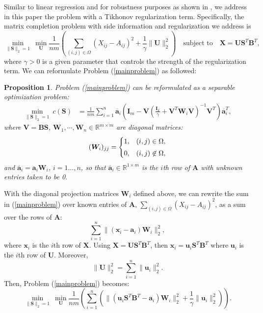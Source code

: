 \documentclass[twoside,11pt]{article}
\newcommand{\md}[1]{\mathbb{#1}}
\newtheorem{prop}{Proposition}
\begin{document}
Similar to linear  regression and for robustness purposes as shown in \cite{bertsimas2018characterization}, we address in this paper  the problem with a Tikhonov regularization term. Specifically, the matrix completion problem with side information and regularization 
we address is
\begin{equation}
\min_{\|\bm{S}\|_2=1} ~\min_{\bm{U}} \frac{1}{nm}\left(\sum_{(i,j) \in \Omega} (X_{ij}-A_{ij})^2 + \frac{1}{\gamma}\|\bm{U}\|_2^2\right) \quad \text{subject to} \quad \bm{X}=\bm{U}\bm{S}^T\bm{B}^T \label{mainproblem},
\end{equation}
where  $\gamma>0$ is a given parameter that controls the strength of the regularization term. We can reformulate Problem (\ref{mainproblem}) as followed:
\begin{prop}
	\label{prop:maintheo}
	Problem (\ref{mainproblem}) can be reformulated as a separable optimization problem:
	\begin{align}
	\min_{\|\bm{S}\|_2=1} ~c(\bm{S})&=\frac{1}{nm} \sum_{i=1}^n \overline{\bm{a}}_i
	\left(\bm{I}_m-\bm{V}\left(\frac{\bm{I}_k}{\gamma}+\bm{V}^T\bm{W}_i\bm{V}\right)^{-1}\bm{V}^T\right)\overline{\bm{a}}_i^T ,\label{eq:mc_central}
	\end{align}
	where $\bm{V}=\bm{B}\bm{S}$, $\bm{W}_1,\cdots, \bm{W}_n\in \md{R}^{m\times m}$
	are   diagonal  matrices:
	\[(\bm{W}_{i})_{jj}=\begin{cases}
	1, & (i,j) \in \Omega, \vspace{3pt} \\
	0, & (i,j) \not \in \Omega,
	\end{cases}\]
	and $\overline{\bm{a}}_i=\bm{a}_i\bm{W}_i$, $i=1\ldots, n$, so that $\overline{\bm{a}}_i \in \md{R}^{1 \times m}$ is the $i$th row of $\bm{A}$ with unknown entries taken to be 0.
\end{prop}
\proof
	With the diagonal projection matrices $\bm{W}_i$ defined above, we can rewrite the sum in (\ref{mainproblem}) over known entries of $\bm{A}$, $ \sum_{(i,j) \in \Omega} (X_{ij}-A_{ij})^2$, as a sum over the rows of $\bm{A}$:
	\begin{equation*}
	\sum_{i=1}^n \|(\bm{x}_i-\bm{a}_i)\bm{W}_i\|_2^2,
	\end{equation*}
	where $\bm{x}_i$ is the $i$th row of $\bm{X}$. Using $\bm{X}=\bm{U}\bm{S}^T\bm{B}^T$, then  $\bm{x}_i=\bm{u}_i\bm{S}^T\bm{B}^T$ where  $\bm{u}_i$ is the $i$th row of $\bm{U}$. Moreover, 
	$$\|\bm{U}\|_2^2=\sum_{i=1}^n \|\bm{u}_i\|_2^2.$$
	Then, Problem (\ref{mainproblem}) 
	becomes:
	$$
	\min_{\|\bm{S}\|_2=1} ~\min_{\bm{U}} \frac{1}{nm}\left( \sum_{i=1}^n \left(\|(\bm{u}_i\bm{S}^T\bm{B}^T-\bm{a}_i)\bm{W}_i\|_2^2 + \frac{1}{\gamma}\|\bm{u}_i\|_2^2\right) \right).
	$$
\end{document}
